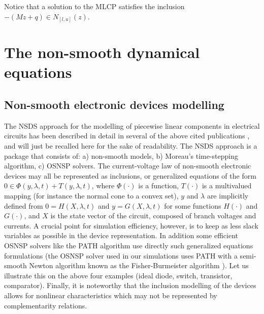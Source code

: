 \documentclass{article}
\begin{document}
Notice that a solution to the MLCP satisfies the inclusion $-(Mz+q) \in N_{[l,u]}(z)$. 


\section{The non-smooth dynamical equations}
\label{section2}

\subsection{Non-smooth electronic devices modelling}
\label{section21}

The NSDS approach for the  modelling of piecewise linear components in electrical circuits has been described in detail  in several of the above cited publications \cite{acary-brogliato2008,glocker2005,moreau1988,jean1999,moreau1999}, and will just be recalled here for the sake of readability. The NSDS approach is a package that consists of: a) non-smooth models, b) Moreau's time-stepping algorithm, c) OSNSP solvers. The current-voltage law of non-smooth electronic devices  may all be represented as inclusions, or generalized equations of the form $0 \in \Phi(y,\lambda,t) + T(y,\lambda,t)$, where $\Phi(\cdot)$ is a function, $T(\cdot)$ is a multivalued mapping (for instance the normal cone to a convex set), $y$ and $\lambda$ are implicitly defined from $0=H(X,\lambda,t)$ and $y=G(X,\lambda,t)$ for some functions $H(\cdot)$ and $G(\cdot)$, and $X$ is the state vector of the circuit, composed of branch voltages and currents. A crucial point for simulation efficiency, however, is to keep as less slack variables as possible in the device representation. In addition some efficient OSNSP solvers like the PATH algorithm use directly such generalized equations formulations (the OSNSP solver used in our simulations uses PATH with a semi-smooth Newton algorithm known as the Fisher-Burmeister algorithm \cite[Chapter 12]{acary-brogliato2008}). Let us illustrate this on the above four examples (ideal diode, switch, transistor, comparator). Finally, it is noteworthy that the inclusion modelling of the devices allows for nonlinear characteristics which may not be represented by complementarity relations. 
\end{document}
